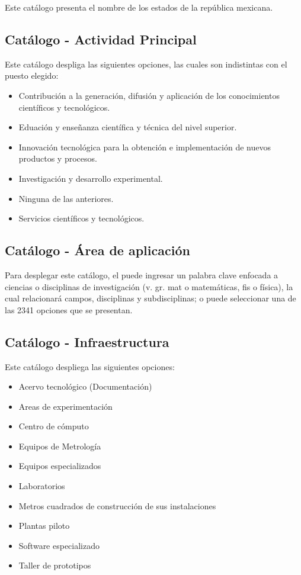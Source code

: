 Este catálogo presenta el nombre de los estados de la república mexicana.


\subsection{Catálogo - Actividad Principal}
\label{appendix:Catalogo:ActividadPrincipal}

Este catálogo despliga las siguientes opciones, las cuales son indistintas con el puesto elegido:

\begin{itemize}
	\item Contribución a la generación, difusión y aplicación de los conocimientos científicos y tecnológicos.
	\item Eduación y enseñanza científica y técnica del nivel superior.
	\item Innovación tecnológica para la obtención e implementación de nuevos productos y procesos.
	\item Investigación y desarrollo experimental.
	\item Ninguna de las anteriores.
	\item Servicios científicos y tecnológicos.
\end{itemize}

\subsection{Catálogo - Área de aplicación}
\label{appendix:Catalogo:AreaAplicacion}

Para desplegar este catálogo, el  puede ingresar un palabra clave enfocada a ciencias o disciplinas de investigación (v. gr. mat o matemáticas, fis o física), la cual relacionará campos, disciplinas y subdisciplinas; o puede seleccionar una de las 2341 opciones que se presentan.


\subsection{Catálogo - Infraestructura}
\label{appendix:Catalogo:Infraestructura}

Este catálogo despliega las siguientes opciones:

\begin{itemize}
	\item Acervo tecnológico (Documentación)
	\item Areas de experimentación
	\item Centro de cómputo
	\item Equipos de Metrología
	\item Equipos especializados
	\item Laboratorios
	\item Metros cuadrados de construcción de sus instalaciones
	\item Plantas piloto
	\item Software especializado
	\item Taller de prototipos
\end{itemize}

